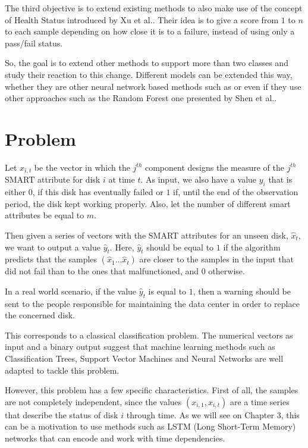 The third objective is to extend existing methods to also make use of the concept of Health Status introduced by Xu et al.\cite{Xu16}.
Their idea is to give a score from $1$ to $n$ to each sample depending on how close it is to a failure, instead of using only a pass/fail status.

So, the goal is to extend other methods to support more than two classes and study their reaction to this change.
Different models can be extended this way, whether they are other neural network based methods such as \cite{Zhu13} or even if they use other approaches such as the Random Forest one presented by Shen et al.\cite{Shen18}.  

\section{Problem}\label{sec:problem}

Let $x_{i,t}$ be the vector in which the $j^{th}$ component designs the measure of the $j^{th}$ SMART attribute for disk $i$ at time $t$.
As input, we also have a value $y_i$ that is either $0$, if this disk has eventually failed or $1$ if, until the end of the observation period, the disk kept working properly.
Also, let the number of different smart attributes be equal to $m$.

Then given a series of vectors with the SMART attributes for an unseen disk, $\hat{x}_t$, we want to output a value $\hat{y}_t$.
Here, $\hat{y}_t$ should be equal to $1$ if the algorithm predicts that the samples $\left(\hat{x}_1\dots\hat{x}_t\right)$ are closer to the samples in the input that did not fail than to the ones that malfunctioned, and $0$ otherwise.

In a real world scenario, if the value $\hat{y}_t$ is equal to $1$, then a warning should be sent to the people responsible for maintaining the data center in order to replace the concerned disk.

This corresponds to a classical classification problem.
The numerical vectors as input and a binary output suggest that machine learning methods such as Classification Trees\cite{Li14}, Support Vector Machines\cite{Zhu13} and Neural Networks\cite{Xu16} are well adapted to tackle this problem.

However, this problem has  a few specific characteristics.
First of all, the samples are not completely independent, since the values $\left(x_{i,1},x_{i,t}\right)$ are a time series that describe the status of disk $i$ through time.
As we will see on Chapter 3, this can be a motivation to use methods such as LSTM (Long Short-Term Memory) networks that can encode and work with time dependencies.

